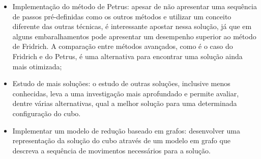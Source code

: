 \begin{itemize}

    \item Implementação do método de Petrus: apesar de não apresentar uma sequência de passos pré-definidas como os outros métodos e utilizar um conceito diferente das outras técnicas, é interessante apostar nessa solução, já que em alguns embaralhamentos pode apresentar um desempenho superior ao método de Fridrich. A comparação entre métodos avançados, como é o caso do Fridrich e do Petrus, é uma alternativa para encontrar uma solução ainda mais otimizada;
    
    
    \item Estudo de mais soluções: o estudo de outras soluções, inclusive menos conhecidas, leva a uma investigação mais aprofundado e permite avaliar, dentre várias alternativas, qual a melhor solução para uma determinada configuração do cubo.  
    
    \item Implementar um modelo de redução baseado em grafos: desenvolver uma representação da solução do cubo através de um modelo em grafo que descreva a sequência de movimentos necessários para a solução. 
    
\end{itemize}